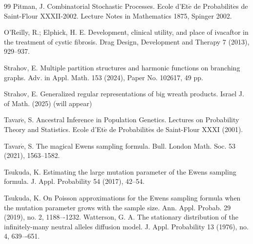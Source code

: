 \documentclass[12pt]{amsart}
\theoremstyle{definition}
\numberwithin{equation}{section}
\begin{document}
\begin{thebibliography}{99}
Pitman, J. Combinatorial Stochastic Processes.
Ecole d'Et$\acute{\mbox{e}}$ de Probabilit$\acute{\mbox{e}}$s
de  Saint-Flour XXXII-2002.
Lecture Notes in Mathematics 1875,
Spinger 2002.

 O'Reilly, R.; Elphick, H. E. Development, clinical utility, and place of ivacaftor in the treatment of cystic fibrosis. Drag  Design, Development and Therapy 7 (2013), 929--937.

 Strahov, E. Multiple partition structures and harmonic functions on branching graphs. Adv. in Appl. Math. 153 (2024), Paper No. 102617, 49 pp.

Strahov, E. Generalized regular representations of big wreath products. Israel J. of Math. (2025)
(will appear)

 Tavar$\acute{\mbox{e}}$, S.
Ancestral Inference in Population Genetics.
Lectures on Probability Theory and Statistics. Ecole d'Et$\acute{\mbox{e}}$
de Probabilit$\acute{\mbox{e}}$s de Saint-Flour XXXI (2001).

 Tavar$\acute{\mbox{e}}$, S.  The magical Ewens sampling formula.
Bull. London Math. Soc. 53 (2021), 1563--1582.

Tsukuda, K. Estimating the large mutation parameter of the Ewens sampling formula. J. Appl. Probability 54 (2017), 42--54.


 Tsukuda, K.  On Poisson approximations for the Ewens sampling formula when the mutation parameter grows with the sample size. Ann. Appl. Probab. 29 (2019), no. 2, 1188–-1232.
Watterson, G. A. The stationary distribution of the infinitely-many neutral alleles diffusion model. J. Appl. Probability 13 (1976), no. 4, 639–-651.

\end{thebibliography}
\end{document}
